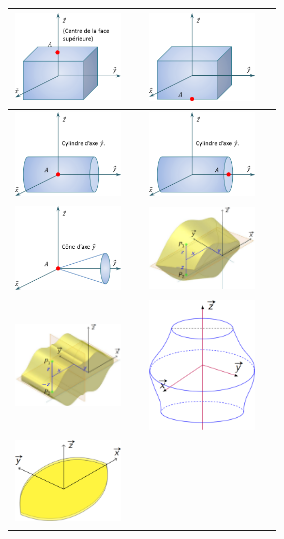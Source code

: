 \documentclass[10pt,fleqn]{article} %
\begin{document}
\begin{center}
\begin{tabular}{|c|p{2cm}||c|p{2cm}|}
\includegraphics[width=2.8cm]{images/qcm/Fig_10} & & \includegraphics[width=2.8cm]{images/qcm/Fig_11} & \\ \hline
\includegraphics[width=2.8cm]{images/qcm/Fig_12} & & \includegraphics[width=2.8cm]{images/qcm/Fig_13} & \\ \hline
\includegraphics[width=2.8cm]{images/qcm/Fig_14} & & \includegraphics[width=2.8cm]{images/qcm/Fig_15} & \\ \hline
\includegraphics[width=2.8cm]{images/qcm/Fig_16} & & \includegraphics[width=2.8cm]{images/qcm/Fig_17} & \\ \hline\includegraphics[width=2.8cm]{images/qcm/Fig_18} & &  & \\ \hline

\end{tabular}
\end{center}
\end{document}
